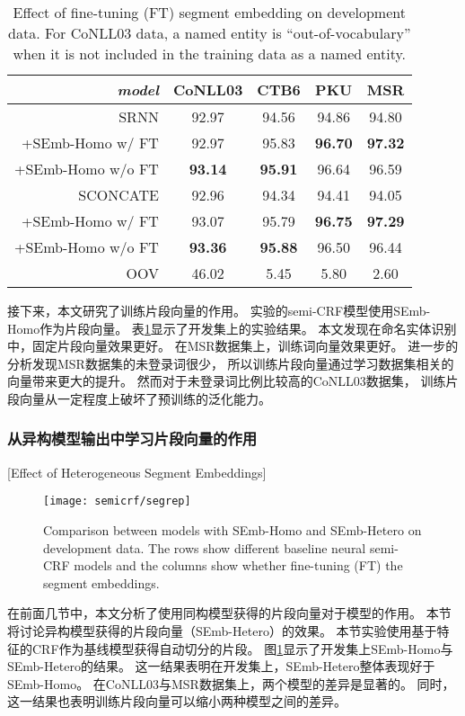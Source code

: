 \begin{table}[t]
	\centering
	\begin{tabular}{r||c|ccc}
		\hline
		\it  model & CoNLL03 & CTB6 & PKU & MSR \\
		\hline
		SRNN & 92.97 & 94.56 & 94.86 & 94.80 \\
		\hdashline[1pt/3pt]
		\sc +SEmb-Homo w/ FT & 92.97 & 95.83 &\bf 96.70 &\bf 97.32 \\
		\sc +SEmb-Homo w/o FT &\bf 93.14 &\bf 95.91 & 96.64 & 96.59 \\
		\hline
		SCONCATE & 92.96 & 94.34 & 94.41 & 94.05 \\
		\hdashline[1pt/3pt]
		\sc +SEmb-Homo w/ FT & 93.07 & 95.79 &\bf 96.75 &\bf 97.29 \\
		\sc +SEmb-Homo w/o FT &\bf 93.36 &\bf 95.88 & 96.50 & 96.44 \\
		\hline
		OOV & 46.02 & 5.45 & 5.80 & 2.60 \\
		\hline
	\end{tabular}
	\caption{Effect of fine-tuning (FT) segment embedding on development data.
		For CoNLL03 data, a named entity is ``out-of-vocabulary'' when it is not included in the training data as a named entity.}
	\label{tbl:semicrf:tuning-effect}
\end{table}

接下来，本文研究了训练片段向量的作用。
实验的semi-CRF模型使用SEmb-Homo作为片段向量。
表\ref{tbl:semicrf:tuning-effect}显示了开发集上的实验结果。
本文发现在命名实体识别中，固定片段向量效果更好。
在MSR数据集上，训练词向量效果更好。
进一步的分析发现MSR数据集的未登录词很少，
所以训练片段向量通过学习数据集相关的向量带来更大的提升。
然而对于未登录词比例比较高的CoNLL03数据集，
训练片段向量从一定程度上破坏了预训练的泛化能力。

\subsubsection{从异构模型输出中学习片段向量的作用}[Effect of Heterogeneous Segment Embeddings]

\begin{figure}[t]
	\texttt{[image: semicrf/segrep]}
	\caption{Comparison between models with {\sc SEmb-Homo} and {\sc SEmb-Hetero} on development data.
		The rows show different baseline neural semi-CRF models and the columns show whether fine-tuning (FT) the segment embeddings.}
	\label{fig:semicrf:bl-vs-crf}
\end{figure}
在前面几节中，本文分析了使用同构模型获得的片段向量对于模型的作用。
本节将讨论异构模型获得的片段向量（SEmb-Hetero）的效果。
本节实验使用基于特征的CRF作为基线模型获得自动切分的片段。
图\ref{fig:semicrf:bl-vs-crf}显示了开发集上SEmb-Homo与SEmb-Hetero的结果。
这一结果表明在开发集上，SEmb-Hetero整体表现好于SEmb-Homo。
在CoNLL03与MSR数据集上，两个模型的差异是显著的。
同时，这一结果也表明训练片段向量可以缩小两种模型之间的差异。

